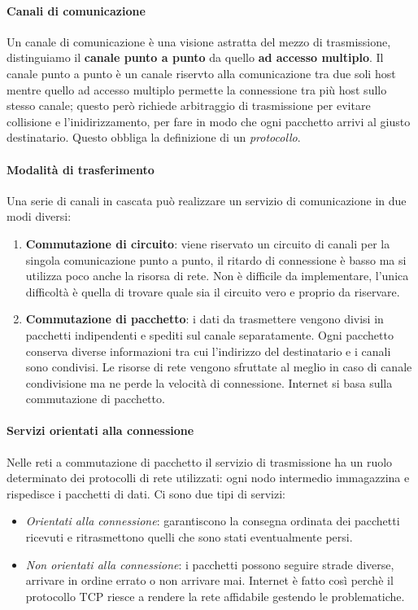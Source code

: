 \documentclass{article}
\begin{document}
\paragraph{Canali di comunicazione}
Un canale di comunicazione è una visione astratta del mezzo di trasmissione,
distinguiamo il \textbf{canale punto a punto} da quello \textbf{ad accesso
    multiplo}. Il canale punto a punto è un canale riservto alla comunicazione tra
due soli host mentre quello ad accesso multiplo permette la connessione tra più
host sullo stesso canale; questo però richiede arbitraggio di trasmissione per
evitare collisione e l'inidirizzamento, per fare in modo che ogni pacchetto
arrivi al giusto destinatario. Questo obbliga la definizione di un
\textit{protocollo}.

\paragraph{Modalità di trasferimento}
Una serie di canali in cascata può realizzare un servizio di comunicazione in
due modi diversi:
\begin{enumerate}
    \item \textbf{Commutazione di circuito}: viene riservato un circuito di canali per la singola comunicazione punto a punto,  il ritardo di connessione è basso ma si utilizza poco anche la risorsa di rete.
          Non è difficile da implementare, l'unica difficoltà è quella di trovare quale sia il circuito vero e proprio da riservare.
    \item \textbf{Commutazione di pacchetto}: i dati da trasmettere vengono divisi in pacchetti indipendenti e spediti sul canale separatamente. Ogni pacchetto conserva diverse informazioni tra cui
          l'indirizzo del destinatario e i canali sono condivisi. Le risorse di rete vengono sfruttate al meglio in caso di canale condivisione ma ne
          perde la velocità di connessione. Internet si basa sulla commutazione di pacchetto.
\end{enumerate}

\paragraph{Servizi orientati alla connessione}
Nelle reti a commutazione di pacchetto il servizio di trasmissione ha un ruolo
determinato dei protocolli di rete utilizzati: ogni nodo intermedio immagazzina
e rispedisce i pacchetti di dati. Ci sono due tipi di servizi:
\begin{itemize}
    \item \textit{Orientati alla connessione}: garantiscono la consegna ordinata dei pacchetti ricevuti e ritrasmettono quelli che sono stati eventualmente persi.
    \item \textit{Non orientati alla connessione}: i pacchetti possono seguire strade diverse, arrivare in ordine errato o non arrivare mai. Internet è fatto così perchè il protocollo TCP riesce a rendere
          la rete affidabile gestendo le problematiche.
\end{itemize}
\end{document}

